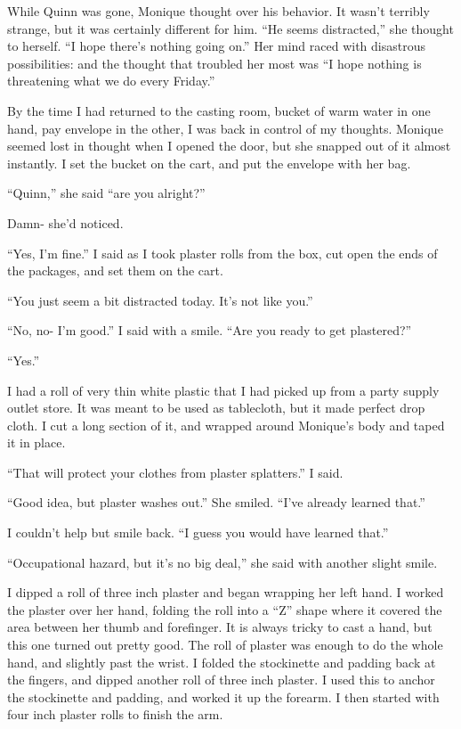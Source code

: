 \begin{thought}
While Quinn was gone, Monique thought over his behavior. It wasn't terribly strange, but
it was certainly different for him. ``He seems distracted,'' she thought to herself. ``I hope
there's nothing going on.'' Her mind raced with disastrous possibilities: and the thought that
troubled her most was ``I hope nothing is threatening what we do every Friday.''
\end{thought}

By the time I had returned to the casting room, bucket of warm water in one hand, pay
envelope in the other, I was back in control of my thoughts. Monique seemed lost in thought when
I opened the door, but she snapped out of it almost instantly. I set the bucket on the cart, and
put the envelope with her bag.

``Quinn,'' she said ``are you alright?''

Damn- she'd noticed.

``Yes, I'm fine.'' I said as I took plaster rolls from the box, cut open the ends of the
packages, and set them on the cart.

``You just seem a bit distracted today. It's not like you.''

``No, no- I'm good.'' I said with a smile. ``Are you ready to get plastered?''

``Yes.''

I had a roll of very thin white plastic that I had picked up from a party supply outlet
store. It was meant to be used as tablecloth, but it made perfect drop cloth. I cut a long
section of it, and wrapped around Monique's body and taped it in place.

``That will protect your clothes from plaster splatters.'' I said.

``Good idea, but plaster washes out.'' She smiled. ``I've already learned that.''

I couldn't help but smile back. ``I guess you would have learned that.''

``Occupational hazard, but it's no big deal,'' she said with another slight smile.

I dipped a roll of three inch plaster and began wrapping her left hand. I worked the
plaster over her hand, folding the roll into a ``Z'' shape where it covered the area between her
thumb and forefinger. It is always tricky to cast a hand, but this one turned out pretty good.
The roll of plaster was enough to do the whole hand, and slightly past the wrist. I folded the
stockinette and padding back at the fingers, and dipped another roll of three inch plaster. I
used this to anchor the stockinette and padding, and worked it up the forearm. I then started
with four inch plaster rolls to finish the arm.

